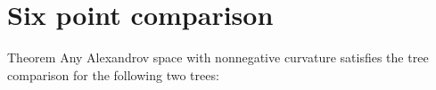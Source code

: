 \section{Six point comparison}

\begin{thm}{Theorem}
Any Alexandrov space with nonnegative curvature satisfies the tree comparison for the following two trees:

\begin{comment}
\begin{center}
\begin{tikzpicture}[scale=1,
  thick,main node/.style={circle,draw,font=\sffamily\bfseries,minimum size=3mm}]
  \node[main node] (1) at (0,0) {};
  \node[main node] (2) at (0,1){};
  \node[main node] (3) at (0,2){};
  \node[main node] (4) at (1,0) {};
  \node[main node] (5) at (1,1) {};
  

  \path[every node/.style={font=\sffamily\small}]
   (1) edge node[above]{}(2)
   (2) edge node[above]{}(3)
   (2) edge node[above]{}(5)
   (4) edge node[above]{}(5);
\end{tikzpicture}
\hskip10mm
\begin{tikzpicture}[scale=1,
  thick,main node/.style={circle,draw,font=\sffamily\bfseries,minimum size=3mm}]

  \node[main node] (1) at (0,0) {};
  \node[main node] (2) at (0,1){};
  \node[main node] (3) at (0,2){};
  \node[main node] (4) at (1,0) {};
  \node[main node] (5) at (1,1) {};
  \node[main node] (6) at (1,2) {};

  \path[every node/.style={font=\sffamily\small}]
   (1) edge node[above]{}(2)
   (2) edge node[above]{}(3)
   (2) edge node[above]{}(5)
   (4) edge node[above]{}(5)
   (5) edge node[above]{}(6);
\end{tikzpicture}
\hskip10mm
\begin{tikzpicture}[scale=1,
  thick,main node/.style={circle,draw,font=\sffamily\bfseries,minimum size=3mm}]

  \node[main node] (1) at (0,1) {};
  \node[main node] (2) at (1,0){};
  \node[main node] (3) at (1,1){};
  \node[main node] (4) at (1,2) {};
  \node[main node] (5) at (2,0) {};
  \node[main node] (6) at (2,1) {};

  \path[every node/.style={font=\sffamily\small}]
   (1) edge node[above]{}(3)
   (2) edge node[above]{}(3)
   (3) edge node[above]{}(6)
   (4) edge node[above]{}(3)
   (5) edge node[above]{}(6);
\end{tikzpicture}
\end{center}
\end{comment}

\end{thm}

